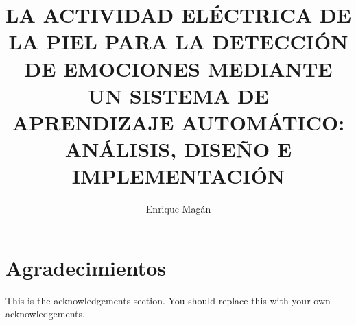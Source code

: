 
\title{LA ACTIVIDAD ELÉCTRICA DE LA PIEL PARA LA DETECCIÓN DE EMOCIONES MEDIANTE UN SISTEMA DE APRENDIZAJE AUTOMÁTICO: ANÁLISIS, DISEÑO E IMPLEMENTACIÓN}

\author{Enrique Magán}








\maketitle


\pagestyle{empty}
\setcounter{savepage}{\thepage}
\begin{abstractpage}

\end{abstractpage}

\setcounter{page}{\thesavepage}
\begin{resumenpage}

\end{resumenpage}

\cleardoublepage

\section*{Agradecimientos}

This is the acknowledgements section. You should replace this with your
own acknowledgements.

